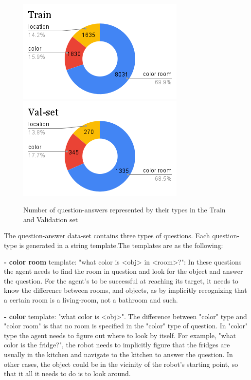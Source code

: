 \begin{figure}[H]
\centering
\includegraphics[scale=0.45]{images/Train.png}
\includegraphics[scale=0.45]{images/Val-set.png}
\caption{Number of question-answers represented by their types in the Train and Validation set}
\label{fig:questioncount}
\end{figure}

The question-answer data-set contains three types of questions. Each question-type is generated in a string template.The templates are as the following:

\textbf{- color room} template: "what color is <obj> in  <room>?": In these questions the agent needs to find the room in question and look for the object and answer the question. For the agent's to be successful at reaching its target, it needs to know the difference between rooms, and objects, as by implicitly recognizing that a certain room is a living-room, not a bathroom and such.  

\textbf{- color} template: "what color is <obj>". The difference between "color" type and "color room" is that no room is specified in the "color" type of question. In "color" type the agent needs to figure out where to look by itself. For example, "what color is the fridge?", the robot needs to implicitly figure that the fridges are usually in the kitchen and navigate to the kitchen to answer the question. In other cases, the object could be in the vicinity of the robot's starting point, so that it all it needs to do is to look around. 

